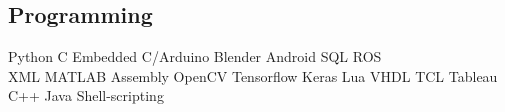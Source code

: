 \documentclass[]{deedy-resume-openfont}
\begin{document}
\begin{minipage}[t]{0.35\textwidth}

\subsection{Programming}
\textbullet{}Python \textbullet{}C \textbullet{}Embedded C/Arduino \textbullet{}Blender \textbullet{}Android \textbullet{}SQL \textbullet{}ROS \\ 
  \textbullet{}XML \textbullet{}MATLAB \textbullet{}Assembly \textbullet{}OpenCV \textbullet{}Tensorflow \textbullet{}Keras \textbullet{}Lua \textbullet{}VHDL \textbullet{}TCL \textbullet{}Tableau\\
\textbullet{}C++ \textbullet{}Java \textbullet{}Shell-scripting
\vspace{0.05in}
%
%

\end{minipage} 
\hfill\vline\hfill
\end{document}
